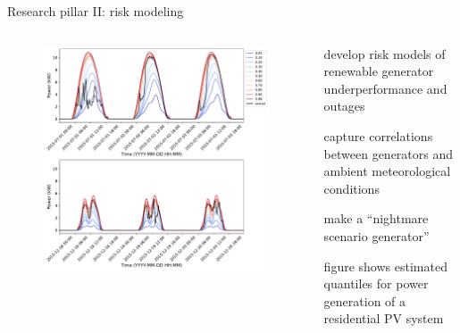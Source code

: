 \documentclass[aspectratio=169,11pt]{beamer}
\begin{document}
\begin{frame}{Research pillar II: risk modeling}
\begin{columns}
	\begin{column}{0.55\textwidth}
		\begin{figure}
			\centering
			\includegraphics[width=\columnwidth]{./figures/quantiles_mapped_back.pdf}
		\end{figure}
	\end{column}
	\begin{column}{0.45\textwidth}
		\BIT
		\item develop risk models of renewable generator underperformance and outages
		\item capture correlations between generators and ambient meteorological conditions
		\item make a “nightmare scenario generator”
		\item figure shows estimated quantiles for power generation of a residential PV system
		\EIT
	\end{column}
\end{columns}
\end{frame}
\end{document}
